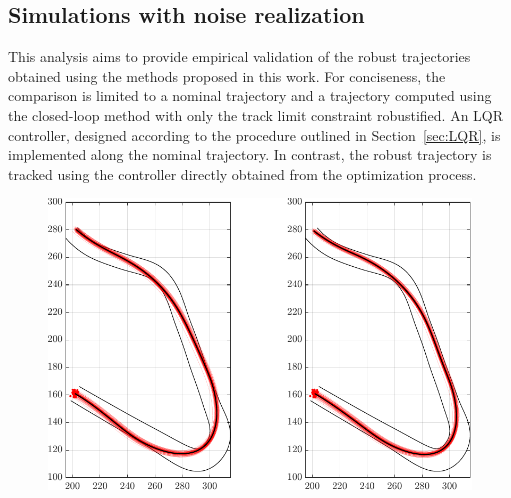 \subsection{Simulations with noise realization}
This analysis aims to provide empirical validation of the robust trajectories obtained using the methods proposed in this work. For conciseness, the comparison is limited to a nominal trajectory and a trajectory computed using the closed-loop method with only the track limit constraint robustified.
An LQR controller, designed according to the procedure outlined in Section~\ref{sec:LQR}, is implemented along the nominal trajectory. In contrast, the robust trajectory is tracked using the controller directly obtained from the optimization process.

\begin{figure}
	\centering
	\includegraphics{Fig/olcl_traj_strings.pdf}
	\caption{}
	\label{fig:traj_strings}
\end{figure}